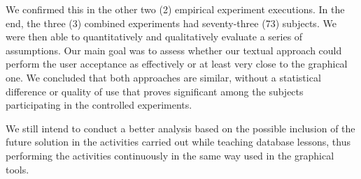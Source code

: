 We confirmed this in the other two (2) empirical experiment executions.
In the end, the three (3) combined experiments had seventy-three (73) subjects.
We were then able to quantitatively and qualitatively evaluate a series of assumptions.
Our main goal was to assess whether our textual approach could perform the user acceptance as effectively or at least very close to the graphical one.
We concluded that both approaches are similar, without a statistical difference or quality of use that proves significant among the subjects participating in the controlled experiments.

We still intend to conduct a better analysis based on the possible inclusion of the future solution in the activities carried out while teaching database lessons, thus performing the activities continuously in the same way used in the graphical tools.

